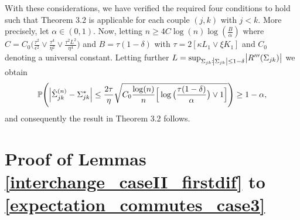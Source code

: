 With these considerations, we have verified the required four conditions to hold such that Theorem 3.2
is applicable for each couple $(j,k)$ with $j < k$. More precisely, let $\alpha \in (0,1)$. Now, letting  $n \geq 4 C \log(n) \log(\frac{B}{\alpha})$
where $C = C_0 \Big(\frac{\tau^2}{\epsilon^2} \vee \frac{\tau^4}{\eta^2} \vee \frac{\tau^2L^2}{\eta^4} \Big)$ and $B = \tau(1-\delta)$
with $\tau = 2 [\kappa L_1 \vee \xi K_1]$  and $C_0$ denoting a universal constant. Letting further $L = \sup_{\Sigma_{jk}: \abs{\Sigma_{jk}} \leq 1- \delta} \abs{R^{\prime\prime\prime}(\Sigma_{jk})}$ we obtain
\begin{equation}\label{individual_bound}
    \mathbb{P}\Bigg( \abs{\hat{\Sigma}^{(n)}_{jk} - \Sigma_{jk}^*} \leq \frac{2\tau}{\eta}\sqrt{C_0\frac{\log(n)}{n}\Big[\log\big(\frac{\tau(1-\delta)}{\alpha}\big) \vee 1\Big] } \Bigg) \geq 1- \alpha,
\end{equation}
and consequently the result in Theorem 3.2 
follows. 



\section{Proof of Lemmas \ref{interchange_caseII_firstdif} to \ref{expectation_commutes_case3}}

